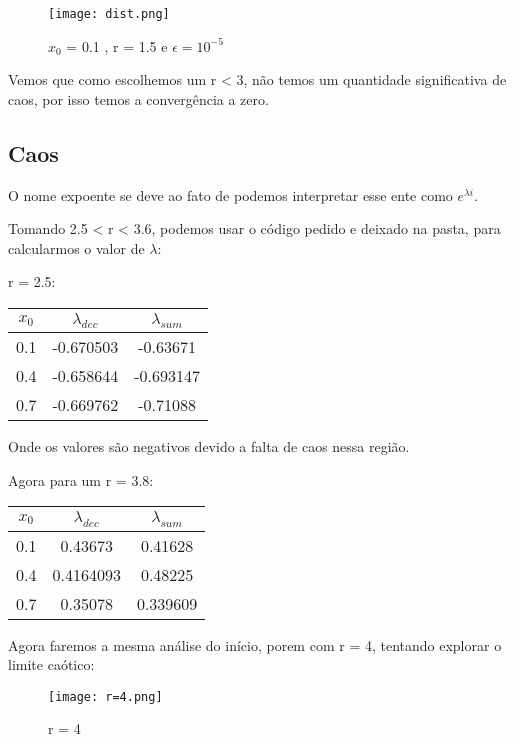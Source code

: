 \documentclass[a4paper, 12pt]{article}
\begin{document}
\begin{figure}[H]
    \centering
    \texttt{[image: dist.png]}
    \caption{$x_{0}$ = 0.1 , r = 1.5 e $\epsilon = 10^{-5}$}
\end{figure}

Vemos que como escolhemos um r < 3, não temos um quantidade significativa de caos, por isso temos a convergência a zero.

\subsection{Caos}

O nome expoente se deve ao fato de podemos interpretar esse ente como $e^{\lambda i}$.

Tomando 2.5 < r < 3.6, podemos usar o código pedido e deixado na pasta, para calcularmos o valor de $\lambda$:

r = 2.5:

\begin{center}
\begin{tabular}{ |c|c|c| } 
 \hline
 $x_{0}$ & $\lambda_{dec}$ & $\lambda_{sum}$\\ \hline
 0.1 & -0.670503 & -0.63671 \\ \hline
 0.4 & -0.658644  & -0.693147 \\ \hline
 0.7 & -0.669762 & -0.71088 \\ 
 \hline
\end{tabular}
\end{center}

Onde os valores são negativos devido a falta de caos nessa região.

\hfill

Agora para um r = 3.8:

\begin{center}
\begin{tabular}{ |c|c|c| } 
 \hline
 $x_{0}$ & $\lambda_{dec}$ & $\lambda_{sum}$\\ \hline
 0.1 & 0.43673 & 0.41628 \\ \hline
 0.4 & 0.4164093  & 0.48225 \\ \hline
 0.7 & 0.35078 & 0.339609\\ 
 \hline
\end{tabular}
\end{center}

Agora faremos a mesma análise do início, porem com r = 4, tentando explorar o limite caótico:

\begin{figure}[H]
    \centering
    \texttt{[image: r=4.png]}
    \caption{r = 4}
\end{figure}
\end{document}
